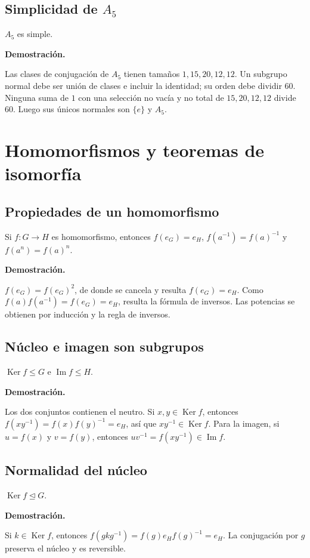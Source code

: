 \documentclass[11pt,a4paper]{article}
\newcommand{\Ker}{\operatorname{Ker}}\newcommand{\Imf}{\operatorname{Im}}\newcommand{\Aut}{\operatorname{Aut}}\newcommand{\mcd}{\operatorname{mcd}}\newcommand{\mcm}{\operatorname{mcm}}
\begin{document}
\subsection{Simplicidad de $A_5$}
\begin{resultado}
$A_5$ es simple.
\end{resultado}
\textbf{Demostración.}
\begin{demostracion}
Las clases de conjugación de $A_5$ tienen tamaños $1,15,20,12,12$. Un subgrupo normal debe ser unión de clases e incluir la identidad; su orden debe dividir $60$. Ninguna suma de $1$ con una selección no vacía y no total de $15,20,12,12$ divide $60$. Luego sus únicos normales son $\{e\}$ y $A_5$.
\end{demostracion}


\section{Homomorfismos y teoremas de isomorfía}

\subsection{Propiedades de un homomorfismo}
\begin{resultado}
Si $f:G\to H$ es homomorfismo, entonces $f(e_G)=e_H$, $f(a^{-1})=f(a)^{-1}$ y $f(a^n)=f(a)^n$.
\end{resultado}
\textbf{Demostración.}
\begin{demostracion}
$f(e_G)=f(e_G)^2$, de donde se cancela y resulta $f(e_G)=e_H$. Como $f(a)f(a^{-1})=f(e_G)=e_H$, resulta la fórmula de inversos. Las potencias se obtienen por inducción y la regla de inversos.
\end{demostracion}


\subsection{Núcleo e imagen son subgrupos}
\begin{resultado}
$\Ker f\le G$ e $\Imf f\le H$.
\end{resultado}
\textbf{Demostración.}
\begin{demostracion}
Los dos conjuntos contienen el neutro. Si $x,y\in\Ker f$, entonces $f(xy^{-1})=f(x)f(y)^{-1}=e_H$, así que $xy^{-1}\in\Ker f$. Para la imagen, si $u=f(x)$ y $v=f(y)$, entonces $uv^{-1}=f(xy^{-1})\in\Imf f$.
\end{demostracion}


\subsection{Normalidad del núcleo}
\begin{resultado}
$\Ker f\trianglelefteq G$.
\end{resultado}
\textbf{Demostración.}
\begin{demostracion}
Si $k\in\Ker f$, entonces $f(gkg^{-1})=f(g)e_H f(g)^{-1}=e_H$. La conjugación por $g$ preserva el núcleo y es reversible.
\end{demostracion}
\end{document}
